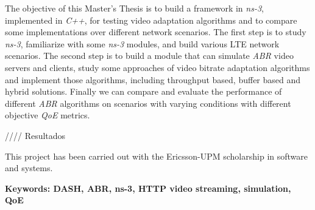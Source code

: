 The objective of this Master's Thesis is to build a framework in \textit{ns-3}, implemented
in \textit{C++}, for testing video adaptation algorithms and to compare some implementations
over different network scenarios. The first step is to study \textit{ns-3}, familiarize with
some \textit{ns-3} modules, and build various LTE network scenarios. The second step is to
build a module that can simulate \textit{ABR} video servers and clients, study some approaches
of video bitrate adaptation algorithms and implement those algorithms, including
throughput based, buffer based and hybrid solutions. Finally we can compare and 
evaluate the performance of different \textit{ABR} algorithms on scenarios with varying 
conditions with different objective \textit{QoE} metrics.

//// Resultados

This project has been carried out with the Ericsson-UPM scholarship in software and systems.

\vfill
\textbf{Keywords: DASH, ABR, ns-3, HTTP video streaming, simulation, QoE} 